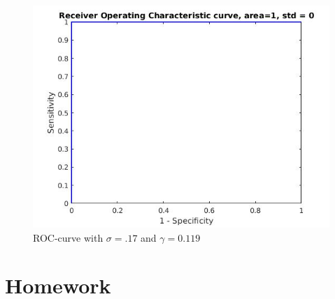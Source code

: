 \documentclass[•]{article}
\begin{document}
\begin{figure}[H]
\centering
\includegraphics[width=.5\textwidth]{roccurve.jpg}
\caption{ROC-curve with $\sigma = .17$ and $\gamma=0.119$}
\end{figure}

\section{Homework}
\end{document}
